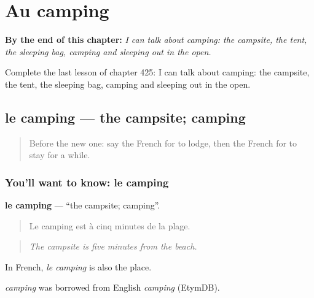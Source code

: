 
\chapter{Au camping}
\label{ch:fr-au-camping}

\begin{chapteropening}
\textbf{By the end of this chapter:} \emph{I can talk about camping: the campsite, the tent, the sleeping bag, camping and sleeping out in the open.}

Complete the last lesson of chapter 425: I can talk about camping: the campsite, the tent, the sleeping bag, camping and sleeping out in the open.
\end{chapteropening}

\section[le camping]{le camping — the campsite; camping}

\label{lesson:FR-C425-camping}



\begin{quote}
Before the new one: say the French for to lodge, then the French for to stay for a while.
\end{quote}

\subsection*{You'll want to know: le camping}
\textbf{le camping} — \textquotedblleft{}the campsite; camping\textquotedblright{}.

\begin{quote}
Le camping est à cinq minutes de la plage.
\end{quote}

\begin{quote}
\emph{The campsite is five minutes from the beach.}
\end{quote}

In French, \emph{le camping} is also the place.

\begin{cousinweb}
\emph{camping} was borrowed from English \emph{camping} (EtymDB).
\end{cousinweb}

